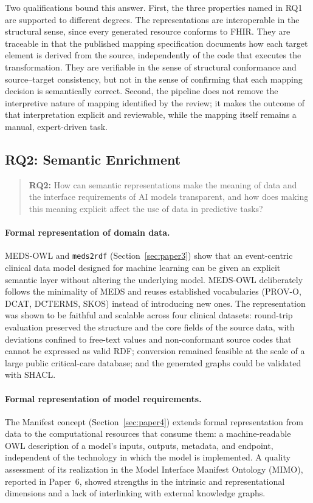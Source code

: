 Two qualifications bound this answer. First, the three properties named in RQ1 are supported to different degrees. The representations are interoperable in the structural sense, since every generated resource conforms to FHIR. They are traceable in that the published mapping specification documents how each target element is derived from the source, independently of the code that executes the transformation. They are verifiable in the sense of structural conformance and source--target consistency, but not in the sense of confirming that each mapping decision is semantically correct. Second, the pipeline does not remove the interpretive nature of mapping identified by the review; it makes the outcome of that interpretation explicit and reviewable, while the mapping itself remains a manual, expert-driven task.

\subsection{RQ2: Semantic Enrichment}
\label{subsec:conclusions_rq2}

\begin{quote}
\textbf{RQ2:} How can semantic representations make the meaning of data and the interface requirements of AI models transparent, and how does making this meaning explicit affect the use of data in predictive tasks?
\end{quote}

\paragraph{Formal representation of domain data.}
MEDS-OWL and \texttt{meds2rdf} (Section~\ref{sec:paper3}) show that an event-centric clinical data model designed for machine learning can be given an explicit semantic layer without altering the underlying model. MEDS-OWL deliberately follows the minimality of MEDS and reuses established vocabularies (PROV-O, DCAT, DCTERMS, SKOS) instead of introducing new ones. The representation was shown to be faithful and scalable across four clinical datasets: round-trip evaluation preserved the structure and the core fields of the source data, with deviations confined to free-text values and non-conformant source codes that cannot be expressed as valid RDF; conversion remained feasible at the scale of a large public critical-care database; and the generated graphs could be validated with SHACL.

\paragraph{Formal representation of model requirements.}
The Manifest concept (Section~\ref{sec:paper4}) extends formal representation from data to the computational resources that consume them: a machine-readable OWL description of a model's inputs, outputs, metadata, and endpoint, independent of the technology in which the model is implemented. A quality assessment of its realization in the Model Interface Manifest Ontology (MIMO), reported in Paper~6, showed strengths in the intrinsic and representational dimensions and a lack of interlinking with external knowledge graphs.


